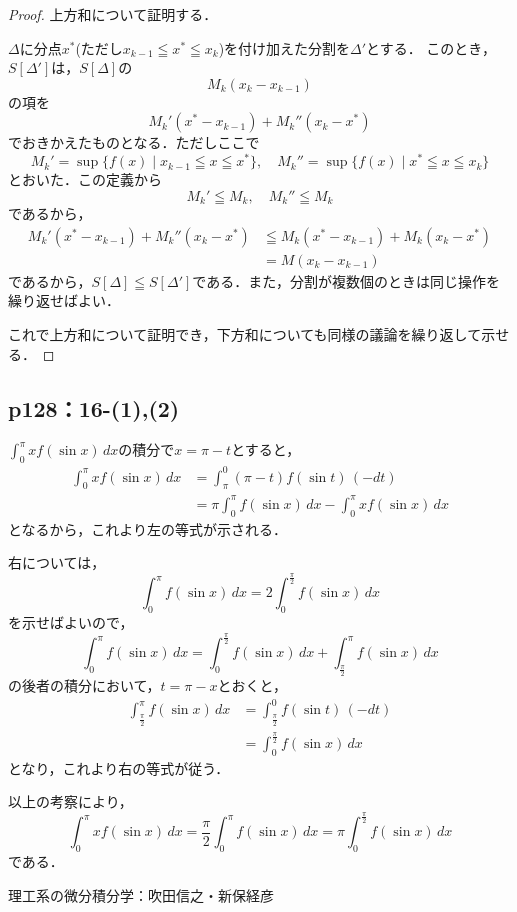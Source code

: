 \documentclass[uplatex,dvipdfmx,a4paper,10pt,fleqn]{jsarticle}
\begin{document}
\begin{tleftbar}
  \begin{proof}
  上方和について証明する．

  $\varDelta$に分点$x^{\ast}$(ただし$ x_{k-1} \leqq x^{\ast} \leqq x_{k}$)を付け加えた分割を$\varDelta '$とする．
  このとき，$ S[\varDelta ']$は，$S[\varDelta]$の
  \[
    M_k (x_k-x_{k-1})
  \]
    の項を
  \[
  M_k' (x^{\ast}-x_{k-1})+M_k ''(x_k - x^{\ast})
  \]
  でおきかえたものとなる．ただしここで
  \[
    M_k ' = \sup \{ f(x) \mid x_{k-1} \leqq x \leqq x^{\ast} \} , \quad M_k '' = \sup \{ f(x) \mid x^\ast \leqq x \leqq x_k \}
  \]
  とおいた．この定義から
  \[
    M_k ' \leqq M_k ,\quad M_k '' \leqq M_k
  \]
  であるから，
  \begin{align*}
    M_k' (x^{\ast}-x_{k-1})+M_k ''(x_k - x^{\ast}) & \leqq M_k (x^{\ast}-x_{k-1})+M_k (x_k - x^{\ast}) \\
    & = M(x_k-x_{k-1})
  \end{align*}
  であるから，$S [\varDelta] \leqq S[ \varDelta']$である．また，分割が複数個のときは同じ操作を繰り返せばよい．
  
  これで上方和について証明でき，下方和についても同様の議論を繰り返して示せる．
\end{proof}
\end{tleftbar}

\newpage 

\subsection*{p128：16-(1),(2)}

$\int_{0}^{\pi} x f(\sin x)\, dx $の積分で$x= \pi -t $とすると，
\begin{align*} 
    \int_{0}^{\pi} x f( \sin x) \, dx & = \int_{\pi}^{0} (\pi - t) f(\sin t )\, ( -dt) \\
    & = \pi \int_{0}^{\pi} f(\sin x) \, dx - \int_{0}^{\pi} x f (\sin x)\, dx 
\end{align*} 
となるから，これより左の等式が示される．

右については，
\[
    \int_{0}^{\pi} f(\sin x)\, dx =2 \int_{0}^{\frac{\pi}{2}} f(\sin x) \, dx 
\]
を示せばよいので，
\[
    \int_{0}^{\pi} f(\sin x)\, dx = \int_{0}^{\frac{\pi}{2}} f(\sin x) \, dx + \int_{\frac{\pi}{2}}^{\pi} f(\sin x)\, dx 
\]
の後者の積分において，$ t = \pi -x$とおくと，
\begin{align*}
    \int_{\frac{\pi}{2}}^{\pi} f(\sin x)\, dx &= \int_{\frac{\pi}{2}}^{0} f (\sin t)\, (-dt) \\
    & = \int_{0}^{\frac{\pi}{2}} f (\sin x)\, dx
\end{align*}
となり，これより右の等式が従う．

以上の考察により，
\[
    \int_{0}^{\pi}x f(\sin x)\, dx=\frac{\pi}{2} \int_{0}^{\pi} f(\sin x)\, dx =\pi \int_{0}^{\frac{\pi}{2}} f(\sin x) \, dx 
\]
である．

\begin{thebibliography}{9}
	 理工系の微分積分学：吹田信之・新保経彦
\end{thebibliography}
\end{document}
